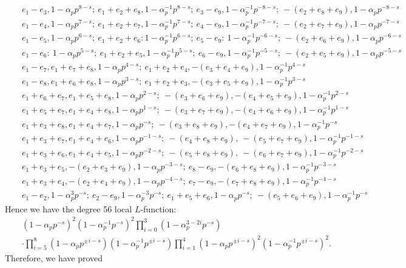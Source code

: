 \documentclass[11pt]{amsart}
\numberwithin{equation}{section}
\theoremstyle{definition}
\begin{document}
\begin{eqnarray*}
&& e_1-e_3, 1-\alpha_p p^{8-s}; \ e_1+e_2+e_8, 1-\alpha_p^{-1} p^{8-s}; \ e_3-e_9, 1-\alpha_p^{-1} p^{-8-s}; \ -(e_2+e_8+e_9), 1-\alpha_p p^{-8-s}\\
&& e_1-e_4, 1-\alpha_p p^{7-s}; \ e_1+e_2+e_7, 1-\alpha_p^{-1} p^{7-s}; \ e_4-e_9, 1-\alpha_p^{-1} p^{-7-s};\ -(e_2+e_7+e_9), 1-\alpha_p p^{-7-s}\\
&& e_1-e_5, 1-\alpha_p p^{6-s}; \ e_1+e_2+e_6: 1-\alpha_p^{-1} p^{6-s}; \ e_5-e_9: \ 1-\alpha_p^{-1} p^{-6-s};\ -(e_2+e_6+e_9), 1-\alpha_p p^{-6-s}\\
&& e_1-e_6: \ 1-\alpha_p p^{5-s}; \ e_1+e_2+e_5, 1-\alpha_p^{-1} p^{5-s}; \ e_6-e_9, 1-\alpha_p^{-1} p^{-5-s};\ -(e_2+e_5+e_9), 1-\alpha_p p^{-5-s}\\
&& e_1-e_7, e_1+e_7+e_8, 1-\alpha_p p^{4-s}; \ e_1+e_2+e_4, -(e_3+e_4+e_9), 1-\alpha_p^{-1} p^{4-s} \\
&& e_1-e_8, e_1+e_6+e_8, 1-\alpha_p p^{3-s}; \ e_1+e_2+e_3,  -(e_3+e_5+e_9), 1-\alpha_p^{-1} p^{3-s} \\
&& e_1+e_6+e_7,  e_1+e_5+e_8, 1-\alpha_p p^{2-s}; \ -(e_3+e_6+e_9), -(e_4+e_5+e_9), 1-\alpha_p^{-1} p^{2-s} \\
&& e_1+e_5+e_7,  e_1+e_4+e_8, 1-\alpha_p p^{1-s}; \ -(e_3+e_7+e_9), -(e_4+e_6+e_9), 1-\alpha_p^{-1} p^{1-s} \\
&& e_1+e_3+e_8,  e_1+e_4+e_7, 1-\alpha_p p^{-s}; \ -(e_3+e_8+e_9), -(e_4+e_7+e_9), 1-\alpha_p^{-1} p^{-s} \\
&& e_1+e_3+e_7,  e_1+e_4+e_6, 1-\alpha_p p^{-1-s}; \ -(e_4+e_8+e_9),\ -(e_5+e_7+e_9), 1-\alpha_p^{-1} p^{-1-s} \\
&& e_1+e_3+e_6,  e_1+e_4+e_5, 1-\alpha_p p^{-2-s}; \ -(e_5+e_8+e_9),\ -(e_6+e_7+e_9), 1-\alpha_p^{-1} p^{-2-s} \\
&& e_1+e_3+e_5,  -(e_2+e_3+e_9),  1-\alpha_p p^{-3-s}; \ e_8-e_9, -(e_6+e_8+e_9), 1-\alpha_p^{-1} p^{-3-s} \\
&& e_1+e_3+e_4,  -(e_2+e_4+e_9), 1-\alpha_p p^{-4-s}; \ e_7-e_9, -(e_7+e_8+e_9), 1-\alpha_p^{-1} p^{-4-s} \\
&& e_1-e_2, 1-\alpha_p^3 p^{-s}; \ e_2-e_9, 1-\alpha_p^{-3} p^{-s}; \ e_1+e_5+e_6, 1-\alpha_p p^{-s}; \ -(e_5+e_6+e_9), 1-\alpha_p^{-1} p^{-s}
\end{eqnarray*}
Hence we have the degree 56 local $L$-function:
\begin{eqnarray*}
&& (1-\alpha_p p^{-s})^2 (1-\alpha_p^{-1} p^{-s})^2
\prod_{i=0}^3 (1-\alpha_p^{3-2i} p^{-s}) \\
&&\cdot \prod_{i=5}^8 (1-\alpha_p p^{\pm i-s})(1-\alpha_p^{-1} p^{\pm i-s})
\prod_{i=1}^4 (1-\alpha_p p^{\pm i-s})^2(1-\alpha_p^{-1} p^{\pm i-s})^2.
\end{eqnarray*}
Therefore, we have proved
\end{document}
